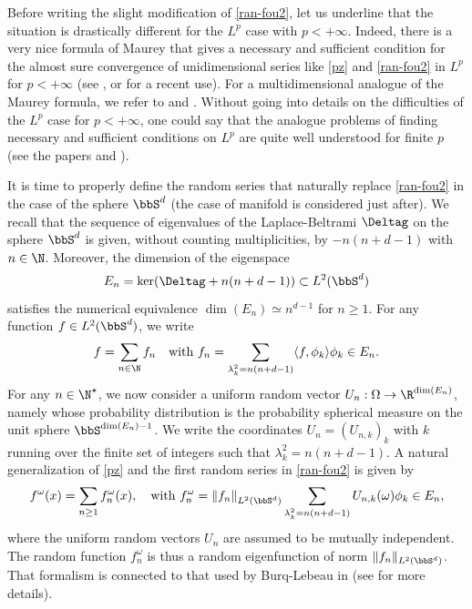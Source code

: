 Before writing the slight modification of \eqref{ran-fou2},
let us underline that the situation is drastically different for the $L^p$ case with $p<+\infty$. Indeed, there is a very nice formula of Maurey that gives a necessary and sufficient condition for the almost sure convergence of unidimensional series like \eqref{pz} and \eqref{ran-fou2} in $L^p$ for $p<+\infty$ (see \cite[p.\,22, Cor.\,1]{maurey1973}, \cite[Th.\,1.d.6]{linden2} or \cite[Prop.\,2.1]{randomh} for a recent use).
For a multidimensional analogue of the Maurey formula, we refer to \cite[Th.\,2.1 \& 2.21]{imek-crusep} and \cite[Th.\,12.1]{imek-aif}.
Without going into details on the difficulties of the $L^p$ case for $p<+\infty$, one could say that the analogue problems of finding necessary and sufficient conditions on $L^p$ are quite well understood for finite $p$ (see the papers \cite{tzvetkov-ay,Tzvetkov4,Grivaux,randomh,imek-crusep} and \cite[Th.\,2.3, 4.5 \& 4.6]{imek-aif}).

It is time to properly define the random series that naturally replace \eqref{ran-fou2} in the case of the sphere $\bbS^d$ (the case of manifold is considered just after).
We recall that the sequence of eigenvalues of the Laplace-Beltrami $\Deltag$ on the sphere $\bbS^d$ is given, without counting multiplicities, by $-n(n+d-1)$ with $n\in \N$. Moreover, the dimension of the eigenspace
\begin{equation}\label{sd-enn}
E_n=\ker(\Deltag+n(n+d-1)) \subset L^2(\bbS^d)
\end{equation}
satisfies the numerical equivalence $\dim(E_n)\simeq n^{d-1}$ for $n\geq 1$.
For any function $f\in L^2(\bbS^d)$, we write
\begin{equation*}
f=\sum_{n\in \N}f_n \quad \text{with } f_n=\sum_{\lambda_k^2=n(n+d-1)} \langle f, \phi_k\rangle \phi_k \in E_n.
\end{equation*}
For any $n\in \N^\star$, we now consider a uniform random vector $U_n:\Omega\to \R^{\dim(E_n)}$, namely whose probability distribution is the
probability spherical measure on the unit sphere $\bbS^{\dim(E_n)-1}$.
We write the coordinates $U_n=(U_{n,k})_{k}$ with $k$ running over the finite set of integers such that
$\lambda_k^2=n(n+d-1)$. A natural generalization of \eqref{pz} and the first random series in \eqref{ran-fou2} is given by	
\begin{equation}\label{ran-fou4}
f^\omega(x)=\sum_{n\geq 1} f_n^\omega(x), \quad \text{with } f_n^\omega=
\left\Vert f_n\right\Vert_{L^2(\bbS^d)} \sum_{\lambda_k^2=n(n+d-1)} U_{n,k}(\omega) \phi_k \in E_n,
\end{equation}
where the uniform random vectors $U_n$ are assumed to be mutually independent.
The random function $f_n^\omega$ is thus a random eigenfunction of norm $\|f_n\|_{L^2(\bbS^d)}$.
That formalism is connected to that used by Burq-Lebeau in \cite[App.\,C]{burq-lebeau} (see \cite[p.\,274]{imek-crusep} for more details).

